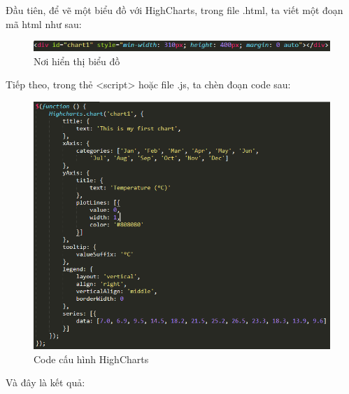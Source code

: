 Đầu tiên, để vẽ một biểu đồ với HighCharts, trong file .html, ta viết một đoạn mã html như sau:

\begin{center}
	\begin{figure}[htp]
		\begin{center}
			\includegraphics[scale=1]{img/divhighcharts}
		\end{center}
		\caption{Nơi hiển thị biểu đồ}
		\label{refhinh8}
	\end{figure}
\end{center}

Tiếp theo, trong thẻ <script> hoặc file .js, ta chèn đoạn code sau:

\begin{center}
	\begin{figure}[htp]
		\begin{center}
			\includegraphics[scale=0.8]{img/highcharts}
		\end{center}
		\caption{Code cấu hình HighCharts}
		\label{refhinh9}
	\end{figure}
\end{center}
\vskip 6cm
Và đây là kết quả:
